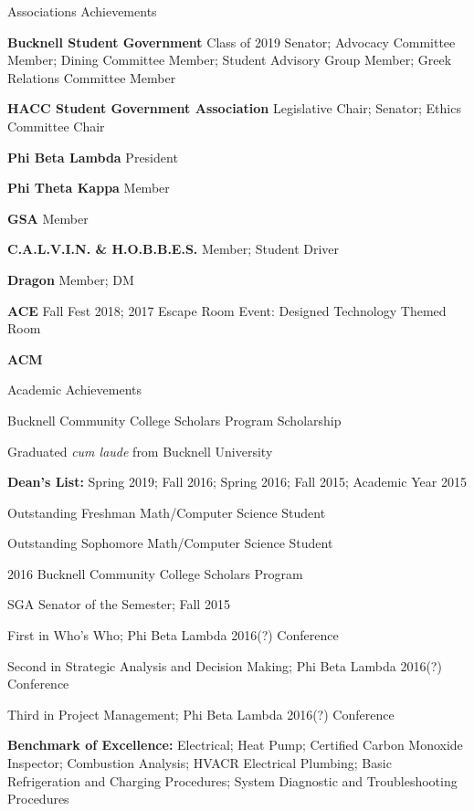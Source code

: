 \documentclass{resume} %
\begin{document}

\begin{rSection}{Associations Achievements} \itemsep -2pt
\item {\bf Bucknell Student Government} Class of 2019 Senator; Advocacy Committee Member; Dining Committee Member; Student Advisory Group Member; Greek Relations Committee Member
\item {\bf HACC Student Government Association} Legislative Chair; Senator; Ethics Committee Chair
\item {\bf Phi Beta Lambda} President
\item {\bf Phi Theta Kappa} Member
\item {\bf GSA} Member
\item {\bf C.A.L.V.I.N. \& H.O.B.B.E.S.} Member; Student Driver
\item {\bf Dragon} Member; DM
\item {\bf ACE} Fall Fest 2018; 2017 Escape Room Event: Designed Technology Themed Room
\item {\bf ACM}


\end{rSection}


\begin{rSection}{Academic Achievements} \itemsep -2pt
\item Bucknell Community College Scholars Program Scholarship
\item Graduated {\it cum laude} from Bucknell University
\item {\bf Dean's List:} Spring 2019; Fall 2016; Spring 2016; Fall 2015; Academic Year 2015
\item Outstanding Freshman Math/Computer Science Student
\item Outstanding Sophomore Math/Computer Science Student
\item 2016 Bucknell Community College Scholars Program
\item SGA Senator of the Semester; Fall 2015
\item First in Who's Who; Phi Beta Lambda 2016(?) Conference
\item Second in Strategic Analysis and Decision Making; Phi Beta Lambda 2016(?) Conference
\item Third in Project Management; Phi Beta Lambda 2016(?) Conference
\item {\bf Benchmark of Excellence:} Electrical; Heat Pump; Certified Carbon Monoxide Inspector; Combustion Analysis; HVACR Electrical Plumbing; Basic Refrigeration and Charging Procedures; System Diagnostic and Troubleshooting Procedures


\end{rSection}
\end{document}
